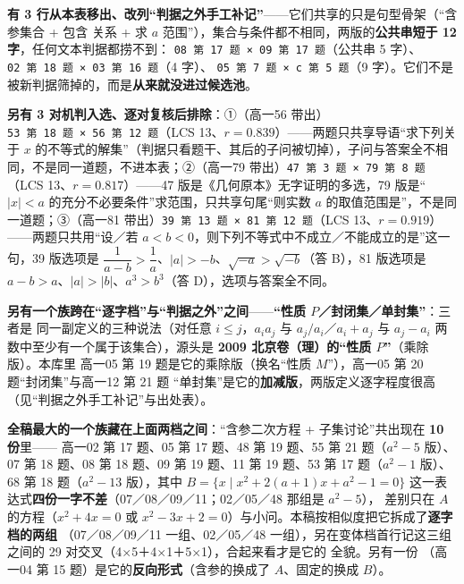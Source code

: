 \documentclass[a4paper,11pt]{article}
\begin{document}
\textbf{有 3 行从本表移出、改列``判据之外手工补记''}------它们共享的只是句型骨架（``含参集合 + 包含
关系 + 求 \(a\) 范围''），集合与条件都不相同，两版的\textbf{公共串短于 12 字}，任何文本判据都捞不到：
\texttt{08\ 第\ 17\ 题\ ×\ 09\ 第\ 17\ 题}（公共串 5 字）、\texttt{02\ 第\ 18\ 题\ ×\ 03\ 第\ 16\ 题}（4 字）、
\texttt{05\ 第\ 7\ 题\ ×\ c\ 第\ 5\ 题}（9 字）。它们不是被新判据筛掉的，而是\textbf{从来就没进过候选池}。

\textbf{另有 3 对机判入选、逐对复核后排除}：①（高一56 带出）\texttt{53\ 第\ 18\ 题\ ×\ 56\ 第\ 12\ 题}（LCS 13、\(r=0.839\)）------两题只共享导语``求下列关于 \(x\) 的不等式的解集''（判据只看题干、其后的子问被切掉），子问与答案全不相同，不是同一道题，不进本表；②（高一79 带出）\texttt{47\ 第\ 3\ 题\ ×\ 79\ 第\ 8\ 题}（LCS 13、\(r=0.817\)）------47 版是《几何原本》无字证明的多选，79 版是``\(\lvert x\rvert<a\) 的充分不必要条件''求范围，只共享句尾``则实数 \(a\) 的取值范围是''，不是同一道题；③（高一81 带出）\texttt{39\ 第\ 13\ 题\ ×\ 81\ 第\ 12\ 题}（LCS 13、\(r=0.919\)）------两题只共用``设／若 \(a<b<0\)，则下列不等式中不成立／不能成立的是''这一句，39 版选项是 \(\dfrac1{a-b}>\dfrac1a\)、\(\lvert a\rvert>-b\)、\(\sqrt{-a}>\sqrt{-b}\)（答 B），81 版选项是 \(a-b>a\)、\(\lvert a\rvert>\lvert b\rvert\)、\(a^3>b^3\)（答 D），选项与答案全不同。

\textbf{另有一个族跨在``逐字档''与``判据之外''之间}------\textbf{``性质 \(P\)／封闭集／单封集''}：三者是
同一副定义的三种说法（对任意 \(i\leqslant j\)，\(a_ia_j\) 与 \(a_j/a_i\)／\(a_i+a_j\) 与 \(a_j-a_i\)
两数中至少有一个属于该集合），源头是 \textbf{2009 北京卷（理）的``性质 \(P\)''}（乘除版）。本库里
高一05 第 19 题是它的乘除版（换名``性质 \(M\)''），高一05 第 20 题``封闭集''与高一12 第 21 题
``单封集''是它的\textbf{加减版}，两版定义逐字程度很高（见``判据之外手工补记''与出处表）。

\textbf{全稿最大的一个族藏在上面两档之间}：``含参二次方程 + 子集讨论''共出现在 \textbf{10 份}里------
高一02 第 17 题、05 第 17 题、48 第 19 题、55 第 21 题（\(a^2-5\) 版）、07 第 18 题、08 第 18 题、09 第 19 题、11 第 19 题、53 第 17 题（\(a^2-1\) 版）、68 第 18 题（\(a^2-13\) 版），其中
\(B=\{x\mid x^2+2(a+1)x+a^2-1=0\}\) 这一表达式\textbf{四份一字不差}（07／08／09／11；02／05／48 那组是 \(a^2-5\)），
差别只在 \(A\) 的方程（\(x^2+4x=0\) 或 \(x^2-3x+2=0\)）与小问。本稿按相似度把它拆成了\textbf{逐字档的两组}
（07／08／09／11 一组、02／05／48 一组），另在变体档首行记这三组之间的 29 对交叉（4$\times$5＋4$\times$1＋5$\times$1），合起来看才是它的
全貌。另有一份
（高一04 第 15 题）是它的\textbf{反向形式}（含参的换成了 \(A\)、固定的换成 \(B\)）。
\end{document}
